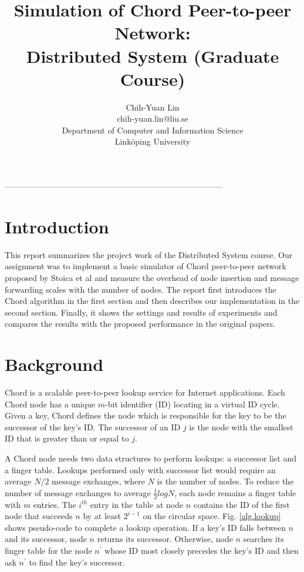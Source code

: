 \documentclass{article}
\title{Simulation of Chord Peer-to-peer Network: \\
Distributed System (Graduate Course)}
\author{Chih-Yuan Lin \\
chih-yuan.lin@liu.se \\
Department of Computer and Information Science\\
Linköping University\\}
\begin{document}
\maketitle
\begin{center}
--------------------------------------------------------------------------------\\
\end{center}

\section*{Introduction}
This report summarizes the project work of the Distributed System course. Our assignment was to implement a basic simulator of Chord peer-to-peer network proposed by Stoica et al \cite{paper, report} and measure the overhead of node insertion and message forwarding scales with the number of nodes. The report first introduces the Chord algorithm in the first section and then describes our implementation in the second section. Finally, it shows the settings and results of experiments and compares the results with the proposed performance in the original papers.

\section*{Background}
Chord is a scalable peer-to-peer lookup service for Internet applications. Each Chord node has a unique $m$-bit identifier (ID) locating in a virtual ID cycle. Given a key, Chord defines the node which is responsible for the key to be the successor of the key's ID. The successor of an ID $j$ is the node with the smallest ID that is greater than or equal to $j$. 

A Chord node needs two data structures to perform lookups: a successor list and a finger table. Lookups performed only with successor list would require an average $N/2$ message exchanges, where $N$ is the number of nodes. To reduce the number of message exchanges to average $\frac{1}{2}logN$, each node remains a finger table with $m$ entries. The $i^{th}$ entry in the table at node $n$ contains the ID of the first node that succeeds $n$ by at least $2^{i-1}$ on the circular space. Fig. \ref{alg.lookup} shows pseudo-code to complete a lookup operation. If a key's ID falls between $n$ and its successor, node $n$ returns its successor. Otherwise, node $n$ searches its finger table for the node $n^\prime$ whose ID most closely precedes the key's ID and then ask $n^\prime$ to find the key's successor.
\end{document}
